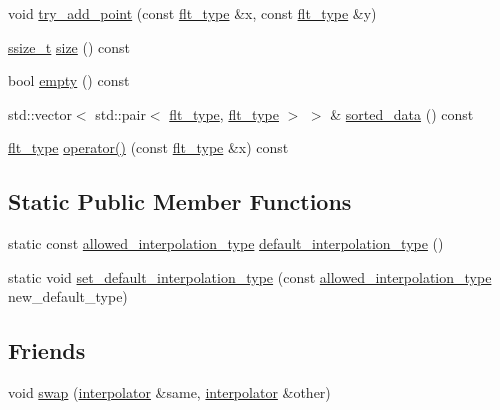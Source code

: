 \begin{DoxyCompactItemize}
\item 
void \hyperlink{classIceBRG_1_1interpolator_a1ee08ef4a77324cea79a34179cf89347}{try\+\_\+add\+\_\+point} (const \hyperlink{lib_2IceBRG__main_2common_8h_ad0f130a56eeb944d9ef2692ee881ecc4}{flt\+\_\+type} \&x, const \hyperlink{lib_2IceBRG__main_2common_8h_ad0f130a56eeb944d9ef2692ee881ecc4}{flt\+\_\+type} \&y)
\item 
\hyperlink{lib_2IceBRG__main_2common_8h_ab322a3e50421dc5f0c43316b1b373592}{ssize\+\_\+t} \hyperlink{classIceBRG_1_1interpolator_a38db60d597a090cfe8b11a33b2df16ae}{size} () const 
\item 
bool \hyperlink{classIceBRG_1_1interpolator_a3611e6f3180070759001cb579e642aef}{empty} () const 
\item 
std\+::vector$<$ std\+::pair$<$ \hyperlink{lib_2IceBRG__main_2common_8h_ad0f130a56eeb944d9ef2692ee881ecc4}{flt\+\_\+type}, \hyperlink{lib_2IceBRG__main_2common_8h_ad0f130a56eeb944d9ef2692ee881ecc4}{flt\+\_\+type} $>$ $>$ \& \hyperlink{classIceBRG_1_1interpolator_a5c376ba6ae01d622f11e536ed0ddde18}{sorted\+\_\+data} () const 
\item 
\hyperlink{lib_2IceBRG__main_2common_8h_ad0f130a56eeb944d9ef2692ee881ecc4}{flt\+\_\+type} \hyperlink{classIceBRG_1_1interpolator_a28f5f8c6a6021ba711305cd7750ae8d7}{operator()} (const \hyperlink{lib_2IceBRG__main_2common_8h_ad0f130a56eeb944d9ef2692ee881ecc4}{flt\+\_\+type} \&x) const 
\end{DoxyCompactItemize}
\subsection*{Static Public Member Functions}
\begin{DoxyCompactItemize}
\item 
static const \hyperlink{classIceBRG_1_1interpolator_af85c1c6a292cff6fa033c8884377544a}{allowed\+\_\+interpolation\+\_\+type} \hyperlink{classIceBRG_1_1interpolator_a64e227abbf2dae875a06a043b828650e}{default\+\_\+interpolation\+\_\+type} ()
\item 
static void \hyperlink{classIceBRG_1_1interpolator_ad4b3b2f74d79a055a07a8fcf3869512a}{set\+\_\+default\+\_\+interpolation\+\_\+type} (const \hyperlink{classIceBRG_1_1interpolator_af85c1c6a292cff6fa033c8884377544a}{allowed\+\_\+interpolation\+\_\+type} new\+\_\+default\+\_\+type)
\end{DoxyCompactItemize}
\subsection*{Friends}
\begin{DoxyCompactItemize}
\item 
void \hyperlink{classIceBRG_1_1interpolator_a0152b79b14a90108930558d46563e7c0}{swap} (\hyperlink{classIceBRG_1_1interpolator}{interpolator} \&same, \hyperlink{classIceBRG_1_1interpolator}{interpolator} \&other)
\end{DoxyCompactItemize}


